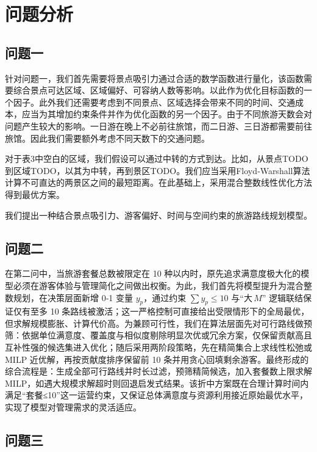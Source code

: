 \chapter[\hspace{0pt}问题分析]{{\heiti{}\hspace{0pt}问题分析}}\label{chapter1: 问题分析}
\removelofgap
\removelotgap

\section[\hspace{-2pt}问题一]{{\heiti{} \hspace{-8pt}问题一}}\label{section1: 问题一}

针对问题一，我们首先需要将景点吸引力通过合适的数学函数进行量化，该函数需要综合景点可达区域、区域偏好、可容纳人数等影响。以此作为优化目标函数的一个因子。此外我们还需要考虑到不同景点、区域选择会带来不同的时间、交通成本，应当为其增加约束条件并作为优化函数的另一个因子。由于不同旅游天数会对问题产生较大的影响。一日游在晚上不必前往旅馆，而二日游、三日游都需要前往旅馆。因此我们需要额外考虑不同天数下的交通问题。

对于表3中空白的区域，我们假设可以通过中转的方式到达。比如，从景点TODO到区域TODO，以其为中转，再到景区TODO。我们应当采用Floyd‑Warshall算法计算不可直达的两景区之间的最短距离。在此基础上，采用混合整数线性优化方法得到最优方案。

我们提出一种结合景点吸引力、游客偏好、时间与空间约束的旅游路线规划模型。

\section[\hspace{-2pt}问题二]{{\heiti{} \hspace{-8pt}问题二}}\label{section1: 问题二}

在第二问中，当旅游套餐总数被限定在 10 种以内时，原先追求满意度极大化的模型必须在游客体验与管理简化之间做出权衡。为此，我们首先将模型提升为混合整数规划，在决策层面新增 0‑1 变量 $y_p$，通过约束 $\sum y_p\le 10$ 与“大 $M$” 逻辑联结保证仅有至多 10 条路线被激活；这一严格控制可直接给出受限情形下的全局最优，但求解规模膨胀、计算代价高。为兼顾可行性，我们在算法层面先对可行路线做预筛：依据单位满意度、覆盖度与相似度剔除明显次优或冗余方案，仅保留贡献高且互补性强的候选集进入优化；随后采用两阶段策略，先在精简集合上求线性松弛或 MILP 近优解，再按贡献度排序保留前 10 条并用贪心回填剩余游客。最终形成的综合流程是：生成全部可行路线并时长过滤，预筛精简候选，加入套餐数上限求解 MILP，如遇大规模求解超时则回退启发式结果。该折中方案既在合理计算时间内满足“套餐≤10”这一运营约束，又保证总体满意度与资源利用接近原始最优水平，实现了模型对管理需求的灵活适应。


\section[\hspace{-2pt}问题三]{{\heiti{} \hspace{-8pt}问题三}}\label{section1: 问题三}



